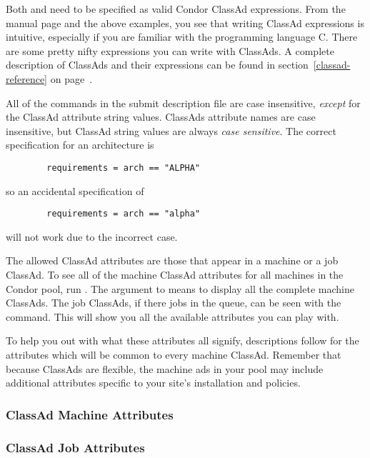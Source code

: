 Both  and  need to be specified 
as valid Condor ClassAd expressions.
From the  manual page and the above examples, you see
that writing ClassAd expressions is intuitive, especially if you
are familiar with the programming language C.  There are some
pretty nifty expressions you can write with ClassAds.
A complete description of ClassAds and their expressions
can be found in section~\ref{classad-reference} on 
page~\pageref{classad-reference}.

All of the commands in the submit description file are case insensitive, 
\emph{except} for the ClassAd attribute string values.
ClassAds attribute names are
case insensitive, but ClassAd string
values are always \emph{case sensitive}.
The correct specification for an architecture is
\begin{verbatim}
        requirements = arch == "ALPHA"
\end{verbatim}
so an accidental specification of
\begin{verbatim}
        requirements = arch == "alpha"
\end{verbatim}
will not work due to the incorrect case.

The allowed
ClassAd attributes are those 
that appear in a machine or a job ClassAd.
To see all of the machine ClassAd attributes for all machines in
the Condor pool, run .  
The  argument to
 means to display all the complete machine ClassAds.
The job ClassAds, if there jobs in the queue, can be seen
with the  command.
This
will show you all the available attributes you can play with.

To help you out with what these attributes all signify,
descriptions follow for the attributes which will be common to every
machine ClassAd. Remember that because ClassAds are flexible, the
machine ads in your pool may include additional attributes specific
to your site's installation and policies. 
\subsubsection{\label{user-man-machad}ClassAd Machine Attributes}

\subsubsection{\label{user-man-machad}ClassAd Job Attributes}




